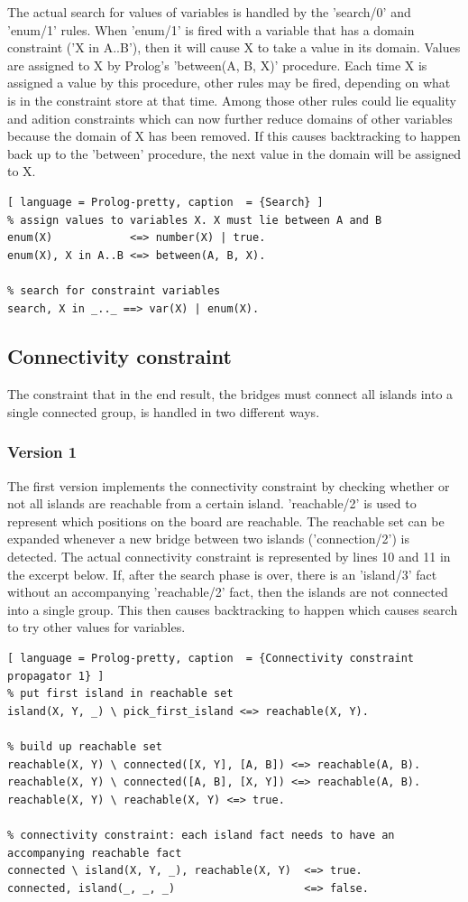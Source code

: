 \documentclass{report}
\begin{document}
The actual search for values of variables is handled by the 'search/0' and 'enum/1' rules. When 'enum/1' is fired with a variable that has a domain constraint ('X in A..B'), then it will cause X to take a value in its domain. Values are assigned to X by Prolog's 'between(A, B, X)' procedure. Each time X is assigned a value by this procedure, other rules may be fired, depending on what is in the constraint store at that time. Among those other rules could lie equality and adition constraints which can now further reduce domains of other variables because the domain of X has been removed. If this causes backtracking to happen back up to the 'between' procedure, the next value in the domain will be assigned to X.
\begin{lstlisting}[ language = Prolog-pretty, caption  = {Search} ]
% assign values to variables X. X must lie between A and B
enum(X)            <=> number(X) | true.
enum(X), X in A..B <=> between(A, B, X).

% search for constraint variables
search, X in _.._ ==> var(X) | enum(X).
\end{lstlisting}

\subsection{Connectivity constraint}
The constraint that in the end result, the bridges must connect all islands into a single connected group, is handled in two different ways.

\subsubsection{Version 1}
The first version implements the connectivity constraint by checking whether or not all islands are reachable from a certain island. 'reachable/2' is used to represent which positions on the board are reachable. The reachable set can be expanded whenever a new bridge between two islands ('connection/2') is detected. The actual connectivity constraint is represented by lines 10 and 11 in the excerpt below. If, after the search phase is over, there is an 'island/3' fact without an accompanying 'reachable/2' fact, then the islands are not connected into a single group. This then causes backtracking to happen which causes search to try other values for variables.
\begin{lstlisting}[ language = Prolog-pretty, caption  = {Connectivity constraint propagator 1} ]
% put first island in reachable set
island(X, Y, _) \ pick_first_island <=> reachable(X, Y).

% build up reachable set
reachable(X, Y) \ connected([X, Y], [A, B]) <=> reachable(A, B).
reachable(X, Y) \ connected([A, B], [X, Y]) <=> reachable(A, B).
reachable(X, Y) \ reachable(X, Y) <=> true.

% connectivity constraint: each island fact needs to have an accompanying reachable fact
connected \ island(X, Y, _), reachable(X, Y)  <=> true.
connected, island(_, _, _)                    <=> false.
\end{lstlisting}
\end{document}
